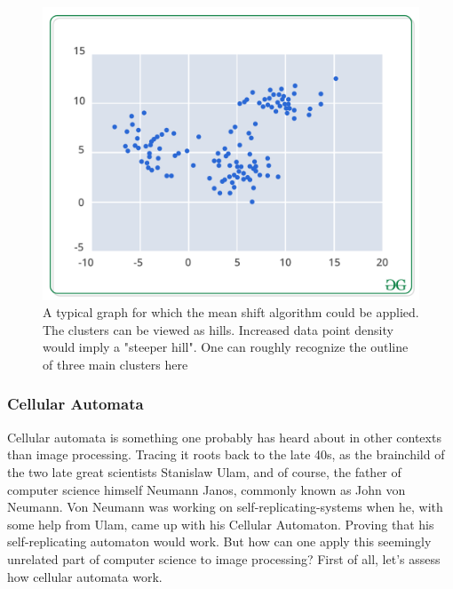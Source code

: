 \documentclass[twoside,a4paper,article]{combine}
\begin{document}
\begin{figure}[H]
    \centering
    \includegraphics[width=1\linewidth]{scattergraph.png}
    \caption{A typical graph for which the mean shift algorithm could be applied. The clusters can be viewed as hills. Increased data point density would imply a "steeper hill". One can roughly recognize the outline of three main clusters here}
    \label{fig:enter-label}
\end{figure}

\subsubsection{Cellular Automata}
Cellular automata is something one probably has heard about in other contexts than image processing. Tracing it roots back to the late 40s, as the brainchild of the two late great scientists Stanislaw Ulam, and of course, the father of computer science himself Neumann Janos, commonly known as John von Neumann. Von Neumann was working on self-replicating-systems when he, with some help from Ulam, came up with his Cellular Automaton. Proving that his self-replicating automaton would work. But how can one apply this seemingly unrelated part of computer science to image processing?  First of all, let's assess how cellular automata work.
\end{document}
